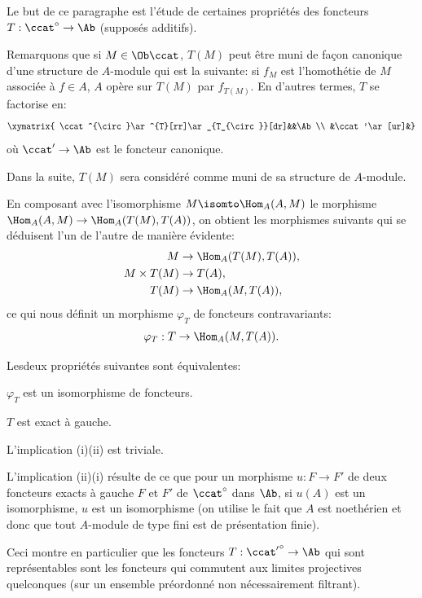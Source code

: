 \smallskip
Le but de ce paragraphe est l'\'etude de certaines propri\'et\'es des foncteurs \hbox{$T: \ccat^{\circ}\to \Ab$} (suppos\'es additifs).

Remarquons que si $M\in \Ob \ccat$, $T(M)$ peut \^etre muni de fa\c
con canonique d'une structure de $A$-module qui est la suivante:
si $f_{M}$ est l'homoth\'etie de $M$ associ\'ee \`a $f\in A$, $A$
op\`ere sur $T(M)$ par $f_{T(M)}$. En d'autres termes, $T$ se
factorise en:
$$
\xymatrix{ \ccat^{\circ}\ar^{T}[rr]\ar_{T_{\circ}}[dr]&&\Ab\\
&\ccat'\ar[ur]&}
$$
o\`u $\ccat'\to \Ab$ est le foncteur canonique.

Dans la suite, $T(M)$ sera consid\'er\'e comme muni de sa structure de $A$-module.

En composant avec l'isomorphisme \hbox{$M\isomto \Hom_{A}(A, M)$} le morphisme $\Hom_{A}(A, M)\to \Hom_{A}(T(M), T(A))$, on obtient les morphismes suivants qui se d\'eduisent l'un de l'autre de mani\`ere \'evidente:
\begin{align*}
M&\to \Hom_{A}(T(M), T(A)),\\
M\times T(M)&\to T(A),\\
T(M)&\to \Hom_{A}(M, T(A)),
\end{align*}
ce qui nous d\'efinit un morphisme $\varphi_{T}$ de foncteurs contravariants:
\begin{eqnarray*}
\varphi_{T}: T\to \Hom_{A}(M, T(A)).
\end{eqnarray*}

\begin{proposition} \label{IV.1.1}
Les\pageoriginale deux propri\'et\'es suivantes sont \'equivalentes:
\begin{enumeratei}
\item
$\varphi_{T}$ est un isomorphisme de foncteurs.

\item
$T$ est exact \`a gauche.
\end{enumeratei}
\end{proposition}

L'implication (i)\ALORS (ii) est triviale.

L'implication (ii)\ALORS (i) r\'esulte de ce que pour un morphisme $u:F\to F'$ de deux foncteurs \ignorespaces exacts \`a gauche $F$ et $F'$ de $\ccat^{\circ}$ dans $\Ab$, si $u(A)$ est un isomorphisme, $u$ est un isomorphisme (on utilise le fait que $A$ est noeth\'erien et donc que tout $A$-module de type fini est de pr\'esentation finie).

\begin{remarque} \label{IV.1.2}
Ceci montre en particulier que les foncteurs $T:{\ccat'}^{\circ}\to \Ab$ qui sont repr\'esentables sont les foncteurs qui commutent aux limites projectives quelconques (sur un ensemble pr\'eordonn\'e non n\'ecessairement filtrant).
\end{remarque}

